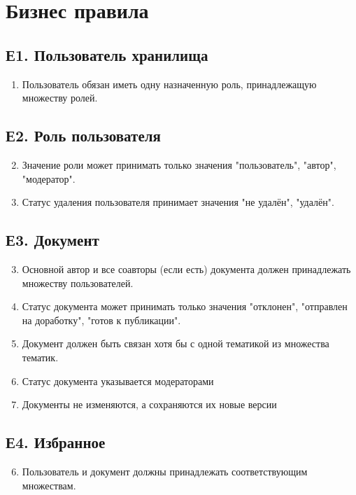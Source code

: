 \section{Бизнес правила}
\subsection*{Е1. Пользователь хранилища}
\begin{enumerate}
  \item Пользователь обязан иметь одну назначенную роль, принадлежащую множеству ролей.
\end{enumerate}
\subsection*{Е2. Роль пользователя}
\begin{enumerate}
  \setcounter{enumi}{1}
  \item Значение роли может принимать только значения "пользователь", "автор", "модератор".
  \item Статус удаления пользователя принимает значения "не удалён", "удалён".
\end{enumerate}
\subsection*{Е3. Документ}
\begin{enumerate}
\setcounter{enumi}{2}
\item Основной автор и все соавторы (если есть) документа должен принадлежать множеству пользователей.
\item Статус документа может принимать только значения "отклонен", "отправлен на доработку", "готов к публикации".
\item Документ должен быть связан хотя бы с одной тематикой из множества тематик.
\item Статус документа указывается модераторами
\item Документы не изменяются, а сохраняются их новые версии
\end{enumerate}

\subsection*{Е4. Избранное}
\begin{enumerate}
\setcounter{enumi}{5}
\item Пользователь и документ должны принадлежать соответствующим множествам.
\end{enumerate}

